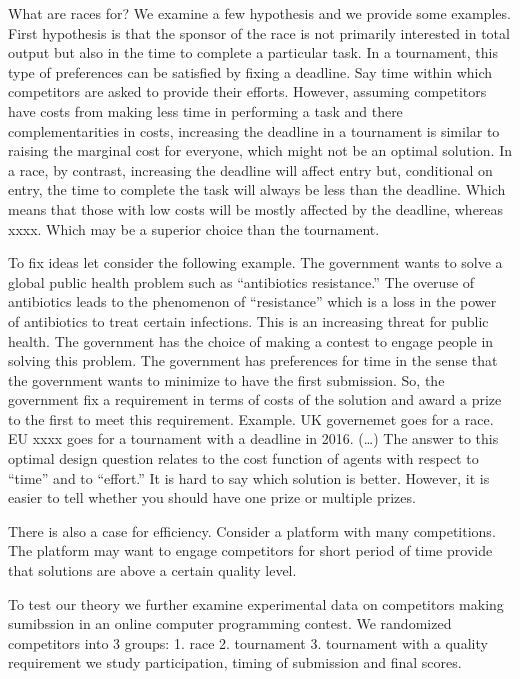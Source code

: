 \documentclass[12pt,]{article}
\begin{document}
What are races for? We examine a few hypothesis and we provide some
examples. First hypothesis is that the sponsor of the race is not
primarily interested in total output but also in the time to complete a
particular task. In a tournament, this type of preferences can be
satisfied by fixing a deadline. Say time within which competitors are
asked to provide their efforts. However, assuming competitors have costs
from making less time in performing a task and there complementarities
in costs, increasing the deadline in a tournament is similar to raising
the marginal cost for everyone, which might not be an optimal solution.
In a race, by contrast, increasing the deadline will affect entry but,
conditional on entry, the time to complete the task will always be less
than the deadline. Which means that those with low costs will be mostly
affected by the deadline, whereas xxxx. Which may be a superior choice
than the tournament.

To fix ideas let consider the following example. The government wants to
solve a global public health problem such as ``antibiotics resistance.''
The overuse of antibiotics leads to the phenomenon of ``resistance''
which is a loss in the power of antibiotics to treat certain infections.
This is an increasing threat for public health. The government has the
choice of making a contest to engage people in solving this problem. The
government has preferences for time in the sense that the government
wants to minimize to have the first submission. So, the government fix a
requirement in terms of costs of the solution and award a prize to the
first to meet this requirement. Example. UK governemet goes for a race.
EU xxxx goes for a tournament with a deadline in 2016. (\ldots{}) The
answer to this optimal design question relates to the cost function of
agents with respect to ``time'' and to ``effort.'' It is hard to say
which solution is better. However, it is easier to tell whether you
should have one prize or multiple prizes.

There is also a case for efficiency. Consider a platform with many
competitions. The platform may want to engage competitors for short
period of time provide that solutions are above a certain quality level.

To test our theory we further examine experimental data on competitors
making sumibssion in an online computer programming contest. We
randomized competitors into 3 groups: 1. race 2. tournament 3.
tournament with a quality requirement we study participation, timing of
submission and final scores.
\end{document}
